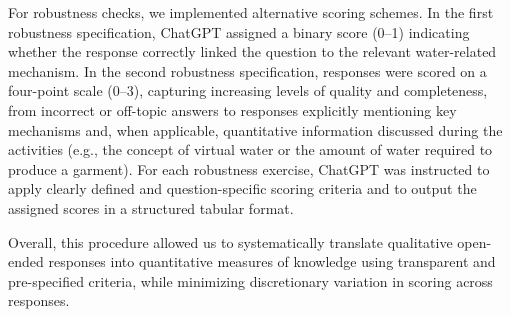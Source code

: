 \documentclass[preprint,12pt]{elsarticle}
\begin{document}
For robustness checks, we implemented alternative scoring schemes. In the first robustness specification, ChatGPT assigned a binary score (0–1) indicating whether the response correctly linked the question to the relevant water-related mechanism. In the second robustness specification, responses were scored on a four-point scale (0–3), capturing increasing levels of quality and completeness, from incorrect or off-topic answers to responses explicitly mentioning key mechanisms and, when applicable, quantitative information discussed during the activities (e.g., the concept of virtual water or the amount of water required to produce a garment). For each robustness exercise, ChatGPT was instructed to apply clearly defined and question-specific scoring criteria and to output the assigned scores in a structured tabular format.

Overall, this procedure allowed us to systematically translate qualitative open-ended responses into quantitative measures of knowledge using transparent and pre-specified criteria, while minimizing discretionary variation in scoring across responses.

\clearpage
 

\end{document}
